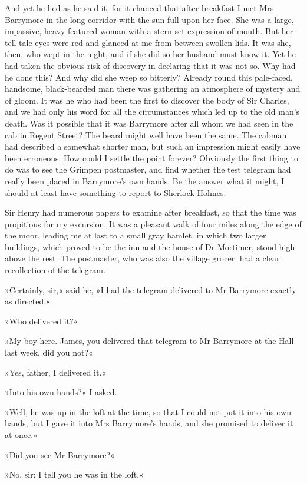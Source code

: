 And yet he lied as he said it, for it chanced that after breakfast I met Mrs Barrymore in the long corridor with the sun full upon her face. She was a large, impassive, heavy-featured woman with a stern set expression of mouth. But her tell-tale eyes were red and glanced at me from between swollen lids. It was she, then, who wept in the night, and if she did so her husband must know it. Yet he had taken the obvious risk of discovery in declaring that it was not so. Why had he done this? And why did she weep so bitterly? Already round this pale-faced, handsome, black-bearded man there was gathering an atmosphere of mystery and of gloom. It was he who had been the first to discover the body of Sir Charles, and we had only his word for all the circumstances which led up to the old man's death. Was it possible that it was Barrymore after all whom we had seen in the cab in Regent Street? The beard might well have been the same. The cabman had described a somewhat shorter man, but such an impression might easily have been erroneous. How could I settle the point forever? Obviously the first thing to do was to see the Grimpen postmaster, and find whether the test telegram had really been placed in Barrymore's own hands. Be the answer what it might, I should at least have something to report to Sherlock Holmes.

Sir Henry had numerous papers to examine after breakfast, so that the time was propitious for my excursion. It was a pleasant walk of four miles along the edge of the moor, leading me at last to a small gray hamlet, in which two larger buildings, which proved to be the inn and the house of Dr Mortimer, stood high above the rest. The postmaster, who was also the village grocer, had a clear recollection of the telegram.

»Certainly, sir,« said he, »I had the telegram delivered to Mr Barrymore exactly as directed.«

»Who delivered it?«

»My boy here. James, you delivered that telegram to Mr Barrymore at the Hall last week, did you not?«

»Yes, father, I delivered it.«

»Into his own hands?« I asked.

»Well, he was up in the loft at the time, so that I could not put it into his own hands, but I gave it into Mrs Barrymore's hands, and she promised to deliver it at once.«

»Did you see Mr Barrymore?«

»No, sir; I tell you he was in the loft.«

